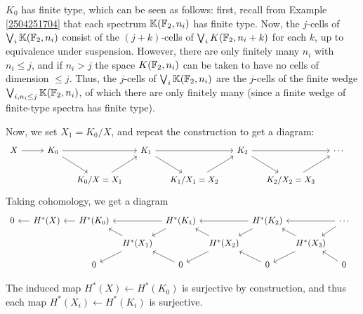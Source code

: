 \documentclass{MetricNotes2023}
\def\bb{\ensuremath\mathbb}
\begin{document}
\begin{remark}
\(K_0\) has finite type, which can be seen as follows: first, recall from Example \ref{2504251704} that each spectrum \(\bb{K}(\bb{F}_2, n_i)\) has finite type. Now, the \(j\)-cells of \(\bigvee_i \bb{K}(\bb{F}_2, n_i)\) consist of the \((j+k)\)-cells of \(\bigvee_i K(\bb{F}_2, n_i+k)\) for each \(k\), up to equivalence under suspension. However, there are only finitely many \(n_i\) with \(n_i\leq j\), and if \(n_i>j\) the space \(K(\bb{F}_2, n_i)\) can be taken to have no cells of dimension \(\leq j\). Thus, the \(j\)-cells of \(\bigvee_i \bb{K}(\bb{F}_2, n_i)\) are the \(j\)-cells of the finite wedge \(\bigvee_{i, n_i\leq j}\bb{K}(\bb{F}_2, n_i)\), of which there are only finitely many (since a finite wedge of finite-type spectra has finite type). 
\end{remark}

Now, we set \(X_1=K_0/X\), and repeat the construction to get a diagram:
\begin{equation}\label{2503301114}
\begin{tikzcd}[column sep=3ex] 
 X \arrow[rr, ""]  & & K_0 \arrow[rr, ""] \arrow[dr, ""] & & K_1 \arrow[dr, ""] \arrow[rr, ""] & & K_2 \arrow[dr, ""] \arrow[rr, ""] & & \cdots \\ 
  &&& K_0/X=X_1 \arrow[ur, ""] & & K_1/X_1=X_2 \arrow[ur, ""] & & K_2/X_2=X_3 \arrow[ur, ""] &  &
 \end{tikzcd}\nonumber
\end{equation}
Taking cohomology, we get a diagram
\begin{equation}\label{2504251239}
\begin{tikzcd}[column sep=1.5ex, row sep = 2ex, arrows=<-]
 0 \arrow[rr, ""] && H^*(X) \arrow[rr,""] & & H^*(K_0) \arrow[rr, ""] \arrow[dr, ""] & & H^*(K_1) \arrow[dr, ""] \arrow[rr, ""] & & H^*(K_2) \arrow[dr, ""] \arrow[rr, ""] & & \cdots \\ 
  &&&&& H^*(X_1) \arrow[ur, ""] \arrow[dr] & & H^*(X_2) \arrow[ur, ""] \arrow[dr] & & H^*(X_3) \arrow[ur, ""] \arrow[dr] &  &\\
&&&& 0 \arrow[ur] && 0 \arrow[ur] && 0 \arrow[ur] && 0
 \end{tikzcd}
\end{equation}

The induced map \(H^*(X)\leftarrow H^*(K_0)\) is surjective by construction, and thus each map \(H^*(X_i)\leftarrow H^*(K_i)\) is surjective. 
\end{document}
